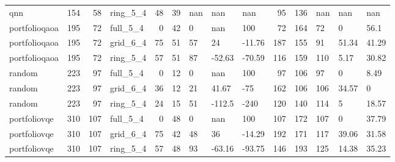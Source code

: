 \begin{longtable}{lrrlrrlllrrlll}
qnn & 154 & 58 & ring\_5\_4 & 48 & 39 & nan & nan & nan & 95 & 136 & nan & nan & nan \\
portfolioqaoa & 195 & 72 & full\_5\_4 & 0 & 42 & 0 & nan & 100 & 72 & 164 & 72 & 0 & 56.1 \\
portfolioqaoa & 195 & 72 & grid\_6\_4 & 75 & 51 & 57 & 24 & -11.76 & 187 & 155 & 91 & 51.34 & 41.29 \\
portfolioqaoa & 195 & 72 & ring\_5\_4 & 57 & 51 & 87 & -52.63 & -70.59 & 116 & 159 & 110 & 5.17 & 30.82 \\
random & 223 & 97 & full\_5\_4 & 0 & 12 & 0 & nan & 100 & 97 & 106 & 97 & 0 & 8.49 \\
random & 223 & 97 & grid\_6\_4 & 36 & 12 & 21 & 41.67 & -75 & 162 & 106 & 106 & 34.57 & 0 \\
random & 223 & 97 & ring\_5\_4 & 24 & 15 & 51 & -112.5 & -240 & 120 & 140 & 114 & 5 & 18.57 \\
portfoliovqe & 310 & 107 & full\_5\_4 & 0 & 48 & 0 & nan & 100 & 107 & 172 & 107 & 0 & 37.79 \\
portfoliovqe & 310 & 107 & grid\_6\_4 & 75 & 42 & 48 & 36 & -14.29 & 192 & 171 & 117 & 39.06 & 31.58 \\
portfoliovqe & 310 & 107 & ring\_5\_4 & 57 & 48 & 93 & -63.16 & -93.75 & 146 & 193 & 125 & 14.38 & 35.23 \\
\end{longtable}
